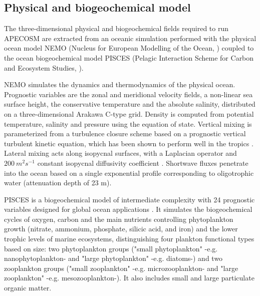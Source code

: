 
\subsection{Physical and biogeochemical model}
\label{sec:nemo}

The three-dimensional physical and biogeochemical fields required to run APECOSM are extracted from an oceanic simulation performed with the physical ocean model NEMO (Nucleus for European Modelling of the Ocean, \citealp{madecNEMOOceanEngine2019}) coupled to the ocean biogeochemical model PISCES (Pelagic Interaction Scheme for Carbon and Ecosystem Studies, \citealp{aumontPISCESv2OceanBiogeochemical2015}). 

NEMO simulates the dynamics and thermodynamics of the physical ocean. Prognostic variables are
the zonal and meridional velocity fields, a non-linear sea surface height, the
conservative temperature and the absolute salinity, distributed on a three-dimensional Arakawa C-type grid. Density is computed from potential temperature, salinity and pressure using the \cite{iocInternationalThermodynamicEquation2010} equation of state. Vertical mixing is parameterized from a turbulence closure scheme based on a prognostic vertical turbulent kinetic equation, which has been shown to perform well in the tropics \citep{blankeVariabilityTropicalAtlantic1993}. Lateral mixing acts along isopycnal surfaces, with a Laplacian operator and $200\ m^2 s^{-1}$ constant isopycnal diffusivity coefficient \citep{lengaigneImpactIsopycnalMixing2003}. Shortwave fluxes penetrate into the ocean based on a single exponential profile \citep{paulsonIrradianceMeasurementsUpper1977} corresponding to oligotrophic water (attenuation depth of 23 m). 

PISCES is a biogeochemical model of intermediate complexity with 24 prognostic variables designed for global ocean applications \citep{aumontPISCESv2OceanBiogeochemical2015}. It simulates the biogeochemical cycles of oxygen, carbon and the main nutrients controlling phytoplankton growth (nitrate, ammonium, phosphate, silicic acid, and iron) and the lower trophic levels of marine ecosystems, distinguishing four plankton functional types based on size: two phytoplankton groups ("small phytoplankton" -e.g. nanophytoplankton- and "large phytoplankton" -e.g. diatoms-) and two zooplankton groups ("small zooplankton" -e.g. microzooplankton- and "large zooplankton" -e.g. mesozooplankton-). It also includes small and large particulate organic matter.


